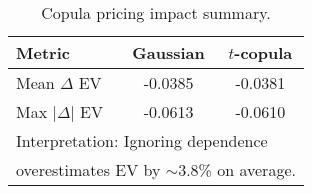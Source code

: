 \begin{table}[t]
  \centering
  \small
  \caption{Copula pricing impact summary.}
  \begin{tabular}{lcc}
    \toprule
 \textbf{Metric} & \textbf{Gaussian} & \textbf{$t$-copula} \\
    \midrule
    Mean $\Delta$ EV & -0.0385 & -0.0381 \\
    Max $|\Delta|$ EV & -0.0613 & -0.0610 \\
    \midrule
    \multicolumn{3}{l}{Interpretation: Ignoring dependence} \\
    \multicolumn{3}{l}{overestimates EV by $\sim$3.8\% on average.} \\
    \bottomrule
  \end{tabular}
  \label{tab:copula_impact_summary}
\end{table}